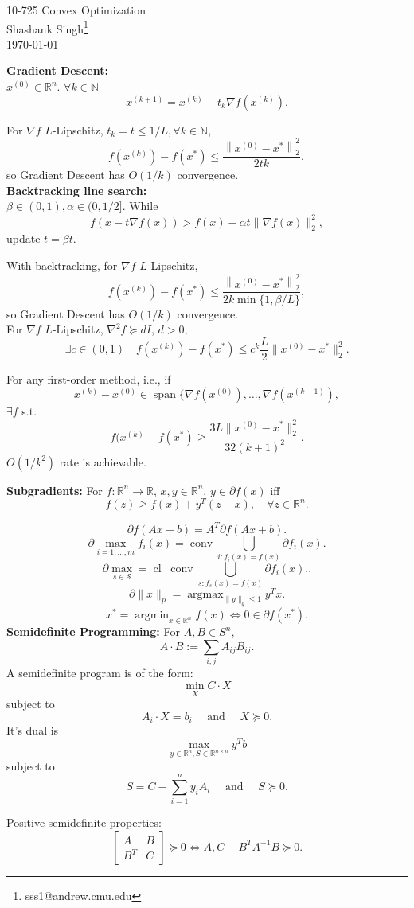 \documentclass[11pt]{article}
\makeatletter
\newcommand{\mytitle}{10-725 Convex Optimization}
\newcommand{\myname}{Shashank Singh\footnote{sss1@andrew.cmu.edu}}
\newcommand{\inv}{^{-1}}                            %
\newcommand{\N}{\mathbb{N}}                         %
\newcommand{\R}{\mathbb{R}}                         %
\newcommand{\lsp}{\operatorname{span}}              %
\newcommand{\conv}{\operatorname{conv}}             %
\newcommand{\cl}{\operatorname{cl}}                 %
\newcommand{\argmax}{\operatorname{argmax}}         %
\newcommand{\argmin}{\operatorname{argmin}}         %
\makeatother
\begin{document}
\thispagestyle{plain}
\twocolumn

\begin{center}
{\Large \mytitle} \\
\myname \\
\today
\end{center}

{\bf Gradient Descent:}\\ $x^{(0)} \in \R^n$. $\forall k \in \N$
\[x^{(k + 1)} = x^{(k)} - t_k \nabla f\left( x^{(k)} \right).\]

For $\nabla f$ $L$-Lipschitz, $t_k = t \leq 1/L, \forall k \in \N$,
\[f\left( x^{(k)} \right) - f\left( x^* \right)
    \leq \frac{\left\|x^{(0)} - x^* \right\|_2^2}{2tk},\]
so Gradient Descent has $O(1/k)$ convergence.   \\

{\bf Backtracking line search:}\\ $\beta \in (0,1), \alpha \in (0,1/2]$. While
\[f(x - t \nabla f(x)) > f(x) - \alpha t \|\nabla f(x)\|_2^2,\]
update $t = \beta t$.

With backtracking, for $\nabla f$ $L$-Lipschitz,
\[f\left( x^{(k)} \right) - f\left( x^* \right)
    \leq \frac{\left\|x^{(0)} - x^* \right\|_2^2}{2k \min\{1,\beta/L\}},\]
so Gradient Descent has $O(1/k)$ convergence.   \\

For $\nabla f$ $L$-Lipschitz, $\nabla^2 f \succeq dI$, $d > 0$,
\[\exists c \in (0,1) \quad
f\left( x^{(k)} \right) - f\left( x^* \right)
 \leq c^k\frac{L}{2} \|x^{(0)} - x^* \|_2^2.
\]

For any first-order method, i.e., if
\[x^{(k)} - x^{(0)} \in \lsp\{\nabla f(x^{(0)}),\dots,\nabla f(x^{(k - 1)}),\]
$\exists f$ s.t.
\[f(x^{(k)} - f(x^*)
    \geq \frac{3L\|x^{(0)} - x^*\|_2^2}{32(k + 1)^2}.
\]
$O(1/k^2)$ rate is achievable.

{\bf Subgradients:} For $f : \R^n \to \R$, $x,y \in \R^n$,
$y \in \partial f(x)$ iff
\[f(z) \geq f(x) + y^T(z - x), \quad \forall z \in \R^n.\]

\[\partial f(Ax + b) = A^T \partial f(Ax + b).\]
\[\partial \max_{i = 1,\dots,m} f_i(x)
    = \conv \bigcup_{i : f_i(x) = f(x)} \partial f_i(x).
\]
\[\partial \max_{s \in \mathcal{S}} 
    = \cl \; \conv \bigcup_{s : f_s(x) = f(x)} \partial f_i(x).
.\]
\[\partial \|x\|_p
    = \argmax_{\|y\|_q \leq 1} y^Tx.
\]
\[x^* = \argmin_{x \in \R^n} f(x)
    \Leftrightarrow 0 \in \partial f(x^*).
\]
{\bf Semidefinite Programming:}
For $A,B \in S^n$,
\[A \cdot B := \sum_{i,j} A_{ij} B_{ij}.\]
A semidefinite program is of the form:
\[\min_X C \cdot X\]
subject to
\[A_i \cdot X = b_i
\quad \mbox{ and } \quad
X \succeq 0.\]
It's dual is
\[\max_{y \in \R^n, S \in \R^{n \times n}} y^Tb\]
subject to
\[S = C - \sum_{i = 1}^n y_i A_i
\quad \mbox{ and } \quad
S \succeq 0.\]

Positive semidefinite properties:
\[
\begin{bmatrix}
    A   &   B   \\
    B^T &   C
\end{bmatrix}   \succeq 0
\Leftrightarrow
A, C - B^T A\inv B \succeq 0.
\]
\end{document}
